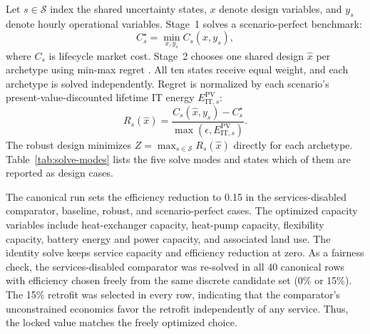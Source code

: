 \documentclass[preprint,12pt]{elsarticle}
\begin{document}
Let $s \in \mathcal{S}$ index the shared uncertainty states, $x$ denote design variables, and $y_s$ denote hourly operational variables. Stage~1 solves a scenario-perfect benchmark:
\begin{equation}
C_s^{\star} = \min_{x,y_s} C_s(x,y_s),
\label{eq:stage-one}
\end{equation}
where $C_s$ is lifecycle market cost. Stage~2 chooses one shared design $\hat{x}$ per archetype using min-max regret \cite{savage1951theory,MR-1626-RPC}. All ten states receive equal weight, and each archetype is solved independently. Regret is normalized by each scenario's present-value-discounted lifetime IT energy $E_{\text{IT},s}^{\text{PV}}$:
\begin{equation}
R_s(\hat{x}) =
\frac{C_s(\hat{x},y_s)-C_s^{\star}}{\max(\epsilon, E_{\text{IT},s}^{\text{PV}})}.
\label{eq:normalised-regret}
\end{equation}
The robust design minimizes $Z=\max_{s\in\mathcal{S}}R_s(\hat{x})$ directly for each archetype. Table~\ref{tab:solve-modes} lists the five solve modes and states which of them are reported as design cases.

The canonical run sets the efficiency reduction to 0.15 in the services-disabled comparator, baseline, robust, and scenario-perfect cases. The optimized capacity variables include heat-exchanger capacity, heat-pump capacity, flexibility capacity, battery energy and power capacity, and associated land use. The identity solve keeps service capacity and efficiency reduction at zero. As a fairness check, the services-disabled comparator was re-solved in all 40 canonical rows with efficiency chosen freely from the same discrete candidate set (0\% or 15\%). The 15\% retrofit was selected in every row, indicating that the comparator's unconstrained economics favor the retrofit independently of any service. Thus, the locked value matches the freely optimized choice.
\end{document}
